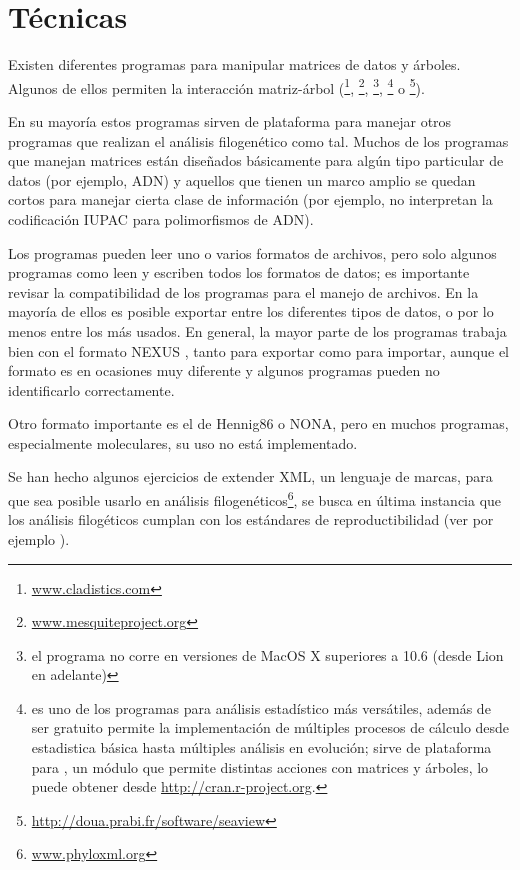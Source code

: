 \section*{T\'ecnicas}

Existen diferentes programas para manipular matrices de datos y \'arboles. Algunos de ellos permiten la interacci\'on matriz-\'arbol 
(\footnote{\url{www.cladistics.com}}, 
\footnote{\url{www.mesquiteproject.org}}, 
\footnote{el programa no corre en versiones de MacOS X superiores a 10.6 (desde Lion en adelante)}, 
\footnote{ es uno de los programas para an\'alisis estad\'istico m\'as vers\'atiles, adem\'as de ser gratuito permite la implementaci\'on de m\'ultiples procesos de c\'alculo desde estadistica b\'asica hasta m\'ultiples an\'alisis en evoluci\'on; sirve de plataforma para  \cite{Paradis2008}, un m\'odulo que permite distintas acciones con matrices y \'arboles, lo puede obtener desde \url{http://cran.r-project.org}.}
o 
\footnote{\url{http://doua.prabi.fr/software/seaview}}). 

En su mayor\'ia estos programas sirven de plataforma para manejar otros programas que realizan el an\'alisis filogen\'etico como tal. Muchos de los programas que manejan matrices est\'an dise\~nados b\'asicamente para alg\'un tipo particular de datos (por ejemplo, ADN) y aquellos que tienen un marco amplio se quedan cortos para manejar cierta clase de informaci\'on (por ejemplo, no interpretan la codificaci\'on IUPAC para polimorfismos de ADN).

Los programas pueden leer uno o varios formatos de archivos, pero solo algunos programas como  leen y escriben todos los formatos de datos; es importante revisar la compatibilidad de los programas para el manejo de archivos. En la mayor\'ia de ellos es posible exportar entre los diferentes tipos de datos, o por lo menos entre los m\'as usados. En general, la mayor parte de los programas trabaja bien con el formato NEXUS \citep{Maddison1997}, tanto para exportar como para importar, aunque el formato es en ocasiones muy diferente y algunos programas pueden no identificarlo correctamente. 

Otro formato importante es el de Hennig86 o NONA, pero en muchos programas, especialmente moleculares, su uso no est\'a implementado.

Se han hecho algunos ejercicios de extender XML, un lenguaje de marcas, para que sea posible usarlo en an\'alisis filogen\'eticos\footnote{\url{www.phyloxml.org}}, se busca en \'ultima instancia que los an\'alisis filog\'eticos cumplan con los est\'andares de reproductibilidad (ver por ejemplo \cite{Cranston2014}).

